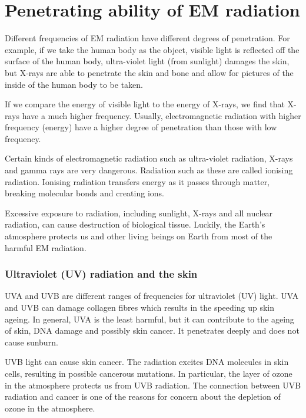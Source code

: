            \section{Penetrating ability of EM radiation}
            \nopagebreak
      \label{m38779*id189450}Different frequencies of EM radiation have different degrees of penetration. For example, if we take the human body as the object, visible light is reflected off the surface of the human body, ultra-violet light (from sunlight) damages the skin, but X-rays are able to penetrate the skin and bone and allow for pictures of the inside of the human body to be taken.\par 
      \label{m38779*id189457}If we compare the energy of visible light to the energy of X-rays, we find that X-rays have a much higher frequency. Usually, electromagnetic radiation with higher frequency (energy) have a higher degree of penetration than those with low frequency.\par 
      \label{m38779*id189462}Certain kinds of electromagnetic radiation such as ultra-violet radiation, X-rays and gamma rays are very dangerous. Radiation such as these are called ionising radiation. Ionising radiation transfers energy as it passes through matter, breaking molecular bonds and creating ions.\par 
      \label{m38779*id189468}Excessive exposure to radiation, including sunlight, X-rays and all nuclear radiation, can cause destruction of biological tissue. Luckily, the Earth's atmosphere protects us and other living beings on Earth from most of the harmful EM radiation.\par 
      \label{m38779*uid17}
            \subsubsection*{Ultraviolet (UV) radiation and the skin}
            \nopagebreak
        \label{m38779*id189482}UVA and UVB are different ranges of frequencies for ultraviolet (UV) light. UVA and UVB can damage collagen fibres which results in the speeding up skin ageing. In general, UVA is the least harmful, but it can contribute to the ageing of skin, DNA damage and possibly skin cancer. It penetrates deeply and does not cause sunburn. \par 
        \label{m38779*id189490}UVB light can cause skin cancer. The radiation excites DNA molecules in skin cells, resulting in possible cancerous mutations. In particular, the layer of ozone in the atmosphere protects us from UVB radiation. The connection between UVB radiation and cancer is one of the reasons for concern about the depletion of ozone in the atmosphere.
        
